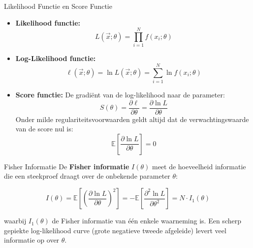\documentclass[11pt,a4paper]{article}
\newcommand{\E}{\mathbb{E}}
\begin{document}
\begin{defbox}{Likelihood Functie en Score Functie}
\begin{itemize}[leftmargin=1.2em]
    \item \textbf{Likelihood functie:}
    \begin{equation}
        L(\vec{x}; \theta) = \prod_{i=1}^N f(x_i; \theta)
    \end{equation}
    \item \textbf{Log-Likelihood functie:}
    \begin{equation}
        \ell(\vec{x}; \theta) = \ln L(\vec{x}; \theta) = \sum_{i=1}^N \ln f(x_i; \theta)
    \end{equation}
    \item \textbf{Score functie:} De gradiënt van de log-likelihood naar de parameter:
    \begin{equation}
        S(\theta) = \frac{\partial \ell}{\partial \theta} = \frac{\partial \ln L}{\partial \theta}
    \end{equation}
    Onder milde regulariteitsvoorwaarden geldt altijd dat de verwachtingswaarde van de score nul is:
    \begin{equation}
        \E\left[ \frac{\partial \ln L}{\partial \theta} \right] = 0
    \end{equation}
\end{itemize}
\end{defbox}

\begin{defbox}{Fisher Informatie}
De \textbf{Fisher informatie} $I(\theta)$ meet de hoeveelheid informatie die een steekproef draagt over de onbekende parameter $\theta$:
\begin{formulabox}
\begin{equation}
    I(\theta) = \E\left[ \left( \frac{\partial \ln L}{\partial \theta} \right)^2 \right] = -\E\left[ \frac{\partial^2 \ln L}{\partial \theta^2} \right] = N \cdot I_1(\theta)
\end{equation}
\end{formulabox}
waarbij $I_1(\theta)$ de Fisher informatie van één enkele waarneming is. Een scherp gepiekte log-likelihood curve (grote negatieve tweede afgeleide) levert veel informatie op over $\theta$.
\end{defbox}
\end{document}
